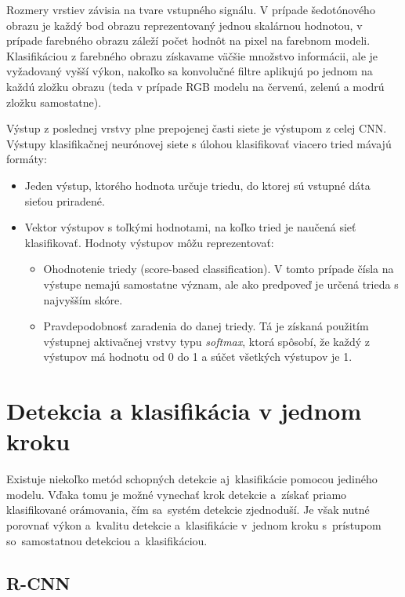         Rozmery vrstiev závisia na tvare vstupného signálu. V prípade šedotónového obrazu je každý bod obrazu reprezentovaný jednou skalárnou hodnotou, v prípade farebného obrazu záleží počet hodnôt na pixel na farebnom modeli. Klasifikáciou z farebného obrazu získavame väčšie množstvo informácii, ale je vyžadovaný vyšší výkon, nakoľko sa konvolučné filtre aplikujú po jednom na každú zložku obrazu (teda v prípade RGB modelu na červenú, zelenú a modrú zložku samostatne).

        Výstup z poslednej vrstvy plne prepojenej časti siete je výstupom z celej \ac{CNN}. Výstupy klasifikačnej neurónovej siete s úlohou klasifikovať viacero tried mávajú formáty:

        \begin{itemize}
            \item Jeden výstup, ktorého hodnota určuje triedu, do ktorej sú vstupné dáta sieťou priradené.
            \item Vektor výstupov s toľkými hodnotami, na koľko tried je naučená sieť klasifikovať. Hodnoty výstupov môžu reprezentovať:
            \begin{itemize}
                \item Ohodnotenie triedy (score-based classification). V tomto prípade čísla na výstupe nemajú samostatne význam, ale ako predpoveď je určená trieda s najvyšším skóre.
                \item Pravdepodobnosť zaradenia do danej triedy. Tá je získaná použitím výstupnej aktivačnej vrstvy typu \emph{softmax}, ktorá spôsobí, že každý z výstupov má hodnotu od 0 do 1 a súčet všetkých výstupov je 1.
            \end{itemize}
        \end{itemize}

\chapter{Detekcia a klasifikácia v jednom kroku}
    Existuje niekoľko metód schopných detekcie aj~klasifikácie pomocou jediného modelu. Vďaka tomu je možné vynechať krok detekcie a~získať priamo klasifikované orámovania, čím sa~systém detekcie zjednoduší. Je však nutné porovnať výkon a~kvalitu detekcie a~klasifikácie v~jednom kroku s~prístupom so~samostatnou detekciou a~klasifikáciou.

    \section{R-CNN}

